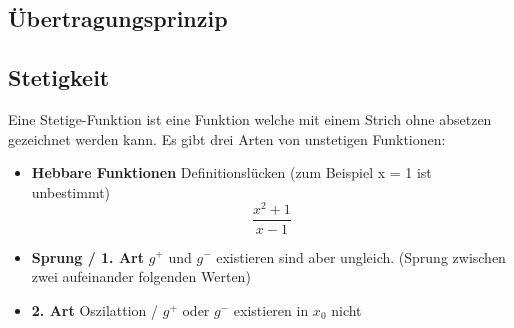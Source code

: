 \documentclass{article}
\begin{document}
	\subsection{Übertragungsprinzip}
	\subsection{Stetigkeit}
	Eine Stetige-Funktion ist eine Funktion welche mit einem Strich ohne absetzen gezeichnet werden kann. Es gibt drei Arten von unstetigen Funktionen: 
	\begin{itemize}
	    \item \textbf{Hebbare Funktionen} Definitionslücken (zum Beispiel x = 1 ist unbestimmt)
	    \begin{equation}
	        \frac{x^2 + 1}{x - 1}
	    \end{equation}
	    \item \textbf{Sprung / 1. Art} $g^+$ und $g^-$ existieren sind aber ungleich. (Sprung zwischen zwei aufeinander folgenden Werten)
	    \item \textbf{2. Art} Oszilattion / $g^+$ oder $g^-$ existieren in $x_0$ nicht
	\end{itemize}
\end{document}
